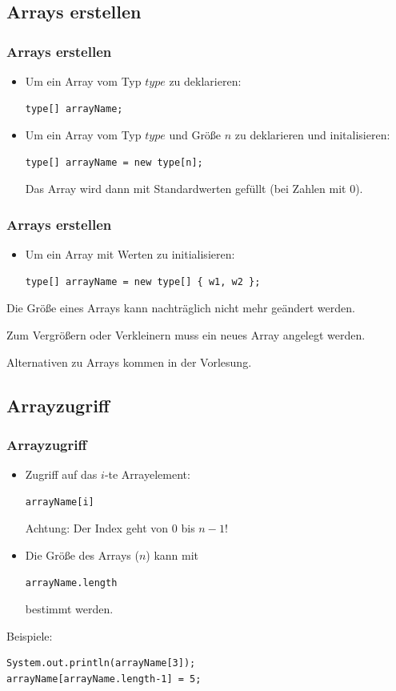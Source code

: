 \documentclass[final]{beamer}
\begin{document}
\subsection{Arrays erstellen}
\begin{frame}[containsverbatim]
	\frametitle{Arrays erstellen}
	\begin{itemize}
	\item{Um ein Array vom Typ $type$ zu deklarieren:
		\begin{lstlisting}
type[] arrayName;
		\end{lstlisting}
		}
	\item{Um ein Array vom Typ $type$ und Größe $n$ zu deklarieren und initalisieren:
		\begin{lstlisting}
type[] arrayName = new type[n];
		\end{lstlisting}
		Das Array wird dann mit Standardwerten gefüllt (bei Zahlen mit $0$).
		}
	\end{itemize}
\end{frame}
\begin{frame}[containsverbatim]
	\frametitle{Arrays erstellen}
	\begin{itemize}
	\item{Um ein Array mit Werten zu initialisieren:
		\begin{lstlisting}
type[] arrayName = new type[] { w1, w2 };
		\end{lstlisting}
		}
	\end{itemize}
	Die Größe eines Arrays kann nachträglich nicht mehr geändert werden.

	Zum Vergrößern oder Verkleinern muss ein neues Array angelegt werden.

	Alternativen zu Arrays kommen in der Vorlesung.
\end{frame}

\subsection{Arrayzugriff}
\begin{frame}[containsverbatim]
	\frametitle{Arrayzugriff}
\begin{itemize}
	\item{Zugriff auf das $i$-te Arrayelement:
	\begin{lstlisting}
arrayName[i]
	\end{lstlisting}
	Achtung: Der Index geht von $0$ bis $n-1$!
	}
	\item{Die Größe des Arrays ($n$) kann mit
	\begin{lstlisting}
arrayName.length
	\end{lstlisting}
	bestimmt werden.
	}
	\end{itemize}

	Beispiele:
	\begin{lstlisting}
System.out.println(arrayName[3]);
arrayName[arrayName.length-1] = 5;
	\end{lstlisting}
\end{frame}
\end{document}
